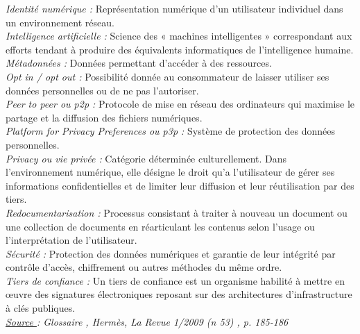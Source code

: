 \documentclass[a4paper,12pt]{article}
\begin{document}
\emph{Identité numérique :} Représentation numérique d’un utilisateur individuel dans un environnement réseau. \\


\emph{Intelligence artificielle :} Science des « machines intelligentes » correspondant aux efforts tendant à produire des équivalents informatiques de l’intelligence humaine. \\


\emph{Métadonnées :} Données permettant d’accéder à des ressources. \\


\emph{Opt in / opt out :} Possibilité donnée au consommateur de laisser utiliser ses données personnelles ou de ne pas l’autoriser. \\


\emph{Peer to peer ou p2p :} Protocole de mise en réseau des ordinateurs qui maximise le partage et la diffusion des fichiers numériques. \\


\emph{Platform for Privacy Preferences ou p3p :} Système de protection des données personnelles. \\


\emph{Privacy ou vie privée :} Catégorie déterminée culturellement. Dans l’environnement numérique, elle désigne le droit qu’a l’utilisateur de gérer ses informations confidentielles et de limiter leur diffusion et leur réutilisation par des tiers. \\


\emph{Redocumentarisation :} Processus consistant à traiter à nouveau un document ou une collection de documents en réarticulant les contenus selon l’usage ou l’interprétation de l’utilisateur. \\


\emph{Sécurité :} Protection des données numériques et garantie de leur intégrité par contrôle d’accès, chiffrement ou autres méthodes du même ordre. \\


\emph{Tiers de confiance :} Un tiers de confiance est un organisme habilité à mettre en œuvre des signatures électroniques reposant sur des architectures d’infrastructure à clés publiques. \\



\emph{\underline{Source }: \emph{Glossaire }, Hermès, La Revue 1/2009 (n 53) , p. 185-186 }

\newpage
\nocite{*}

\end{document}
